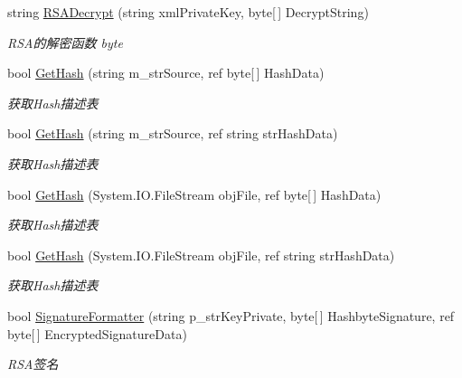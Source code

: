 \begin{DoxyCompactItemize}
string \hyperlink{class_x_c_l_net_tools_1_1_encrypt_1_1_r_s_a_cryption_ab7bda8b65def11fd1bb4adf1384179f7}{R\-S\-A\-Decrypt} (string xml\-Private\-Key, byte\mbox{[}$\,$\mbox{]} Decrypt\-String)
\begin{DoxyCompactList}\small\item\em R\-S\-A的解密函数 byte \end{DoxyCompactList}\item 
bool \hyperlink{class_x_c_l_net_tools_1_1_encrypt_1_1_r_s_a_cryption_af5565911cb529cf571c4ffa79ee3cd98}{Get\-Hash} (string m\-\_\-str\-Source, ref byte\mbox{[}$\,$\mbox{]} Hash\-Data)
\begin{DoxyCompactList}\small\item\em 获取\-Hash描述表 \end{DoxyCompactList}\item 
bool \hyperlink{class_x_c_l_net_tools_1_1_encrypt_1_1_r_s_a_cryption_a453b18fdbccb2267733de128b72b2633}{Get\-Hash} (string m\-\_\-str\-Source, ref string str\-Hash\-Data)
\begin{DoxyCompactList}\small\item\em 获取\-Hash描述表 \end{DoxyCompactList}\item 
bool \hyperlink{class_x_c_l_net_tools_1_1_encrypt_1_1_r_s_a_cryption_aa17ed47b9801531c69d3a3572d78aee7}{Get\-Hash} (System.\-I\-O.\-File\-Stream obj\-File, ref byte\mbox{[}$\,$\mbox{]} Hash\-Data)
\begin{DoxyCompactList}\small\item\em 获取\-Hash描述表 \end{DoxyCompactList}\item 
bool \hyperlink{class_x_c_l_net_tools_1_1_encrypt_1_1_r_s_a_cryption_aab81fea26f9a3b878a00b42ee35d29fc}{Get\-Hash} (System.\-I\-O.\-File\-Stream obj\-File, ref string str\-Hash\-Data)
\begin{DoxyCompactList}\small\item\em 获取\-Hash描述表 \end{DoxyCompactList}\item 
bool \hyperlink{class_x_c_l_net_tools_1_1_encrypt_1_1_r_s_a_cryption_aedbefd6ab8da821fa2857aab5a997bd2}{Signature\-Formatter} (string p\-\_\-str\-Key\-Private, byte\mbox{[}$\,$\mbox{]} Hashbyte\-Signature, ref byte\mbox{[}$\,$\mbox{]} Encrypted\-Signature\-Data)
\begin{DoxyCompactList}\small\item\em R\-S\-A签名 \end{DoxyCompactList}\item 

\end{DoxyCompactItemize}
